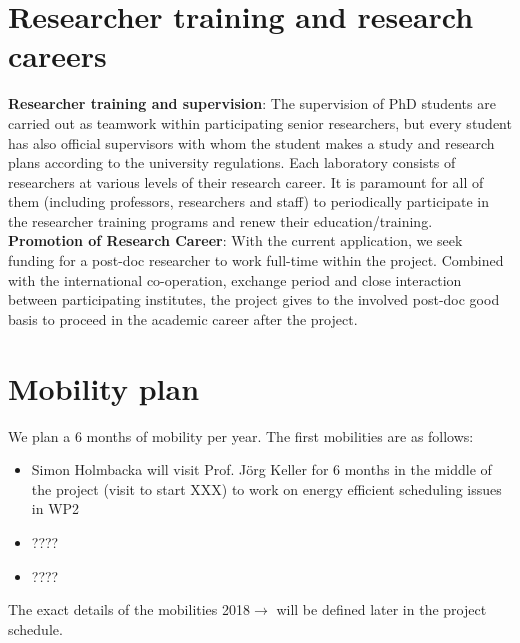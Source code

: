 \documentclass{article}
\begin{document}
\section{Researcher training and research careers}
\textbf{Researcher training and supervision}: The supervision of PhD students are carried out as teamwork within participating senior researchers, 
but every student has also official supervisors with whom the student makes a study and research plans according to the university regulations. 
Each laboratory consists of researchers at various levels of their research career. 
It is paramount for all of them (including professors, researchers and staff) to periodically participate in the researcher training programs and renew their education/training.\\ 
\textbf{Promotion of Research Career}: With the current application, we seek funding for a post-doc researcher to work full-time within the project. 
Combined with the international co-operation, exchange period and close interaction between participating institutes, the project gives to the involved post-doc good basis to proceed in the academic career after the project.

\section{Mobility plan}
We plan a 6 months of mobility per year. The first mobilities are as follows:
\begin{itemize}
 \item Simon Holmbacka will visit Prof. Jörg Keller for 6 months in the middle
of the project (visit to start XXX) to work on energy efficient scheduling issues in WP2
\item ????
\item ????

\end{itemize}


The exact details of the mobilities 2018$\longrightarrow$ will be defined later in the project
schedule.






\end{document}
